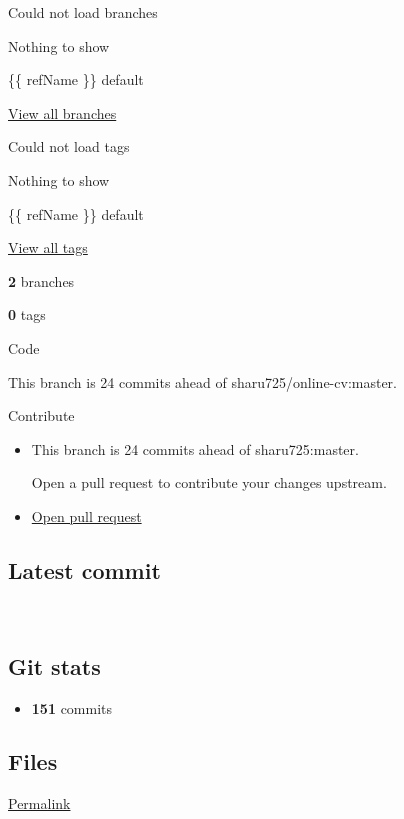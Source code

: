 \documentclass[english,]{article}
\providecommand{\tightlist}{%
  \setlength{\itemsep}{0pt}\setlength{\parskip}{0pt}}
\begin{document}
\hypertarget{ref-list-branches}{}
Could not load branches

Nothing to show

{\{\{ refName \}\}} {default}

\href{/alexpoulis/online-cv/branches}{View all branches}

\hypertarget{tags-menu}{}
Could not load tags

Nothing to show

{\{\{ refName \}\}} {default}

\href{/alexpoulis/online-cv/tags}{View all tags}

\textbf{2} {branches}

\textbf{0} {tags}

{ }

Code{}

This branch is 24 commits ahead of sharu725/online-cv:master.

Contribute

\begin{itemize}
\item
  This branch is 24 commits ahead of sharu725:master.

  Open a pull request to contribute your changes upstream.
\item
  \href{/alexpoulis/online-cv/pull/new/master}{Open pull request}
\end{itemize}

\hypertarget{latest-commit}{%
\subsection{Latest commit}\label{latest-commit}}

~

\hypertarget{git-stats}{%
\subsection{Git stats}\label{git-stats}}

\begin{itemize}
\tightlist
\item
  { \textbf{151} { commits } }
\end{itemize}

\hypertarget{files}{%
\subsection{Files}\label{files}}

\href{/alexpoulis/online-cv/tree/36f3fb031b223afbc7664fa130ea815e07db1586}{Permalink}
\end{document}
